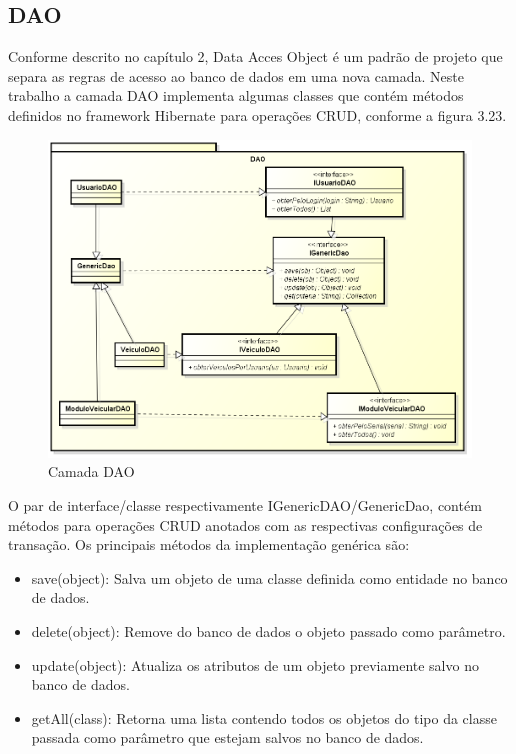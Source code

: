 \subsection{DAO}

Conforme descrito no capítulo 2, Data Acces Object é um padrão de projeto que separa as regras de acesso ao banco de dados em uma nova camada. Neste trabalho a camada DAO implementa algumas classes que contém métodos definidos no framework Hibernate para operações CRUD, conforme a figura 3.23.

\begin{figure}[!htb]
	\centering
	\includegraphics[width=\textwidth]{figures/dao_layer.png}
	\caption{Camada DAO}
	\label{}
\end{figure}

O par de interface/classe respectivamente IGenericDAO/GenericDao, contém métodos para operações CRUD anotados com as respectivas configurações de transação. Os principais métodos da implementação genérica são:

\begin{itemize}
	\item save(object): Salva um objeto de uma classe definida como entidade no banco de dados.
	\item delete(object): Remove do banco de dados o objeto passado como parâmetro.
	\item update(object): Atualiza os atributos de um objeto previamente salvo no banco de dados.
	\item getAll(class): Retorna uma lista contendo todos os objetos do tipo da classe passada como parâmetro que estejam salvos no banco de dados.
\end{itemize}

